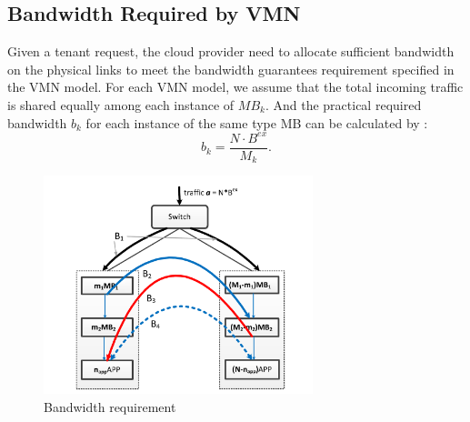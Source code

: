 \documentclass[review]{elsarticle}
\begin{document}
\subsection{Bandwidth Required by VMN}
Given a tenant request, the cloud provider need to allocate sufficient bandwidth on the physical links to meet the bandwidth guarantees requirement specified in the VMN model.
For each VMN model, we assume that the total incoming traffic is shared equally among each instance of $MB_k$. And the practical required bandwidth $b_k$ for each instance of the same type MB can be calculated by :
\begin{equation}
\label{equ:bk}
b_{k}=\frac{N\cdot B^{ex}}{M_{k}}.
\end{equation}


\begin{figure}
	\centering
	     \includegraphics[width=3.2 in, height=2.5in]{fig/bandwidth_requirement.pdf}
	\caption{Bandwidth requirement}
	\label{fig:bw}
\end{figure}
\end{document}
